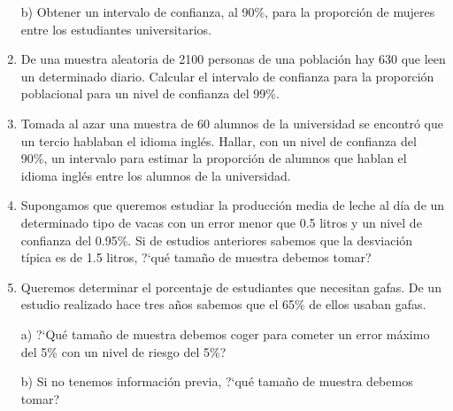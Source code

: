 \begin{adjustwidth}{20pt}{10pt}
\begin{enumerate}[PB. 1. ]
b) Obtener un intervalo de confianza, al 90\%, para la proporción de mujeres entre los estudiantes universitarios.


		
		\hspace{-1cm}\vspace{1cm}
		
	\item 	De una muestra aleatoria de 2100 personas de una población hay 630 que leen un determinado diario. Calcular el intervalo de confianza para la proporción poblacional para un nivel de confianza del 99\%.
		
		\hspace{-1cm}\vspace{1cm}
		
			
	\item 	Tomada al azar una muestra de 60 alumnos de la universidad se encontró que un tercio hablaban el idioma inglés. Hallar, con un nivel de confianza del 90\%, un intervalo para estimar la proporción de alumnos que hablan el idioma inglés entre los alumnos de la universidad.  
		
		\hspace{-1cm}\vspace{1cm}
		
	\item 	Supongamos que queremos estudiar la producción media de leche al día de un determinado tipo de vacas con un error menor que 0.5 litros y un nivel de confianza del 0.95\%. Si de estudios anteriores sabemos que la desviación típica es de 1.5 litros, ?`qué tamaño de muestra debemos tomar?
		
		\hspace{-1cm}\vspace{1cm}
		
	\item 	Queremos determinar el porcentaje de estudiantes que necesitan gafas. De un estudio realizado hace tres años sabemos que el 65\% de ellos usaban gafas.

a) ?`Qué tamaño de muestra debemos coger para cometer un error máximo del 5\% con un nivel de riesgo del 5\%?

b) Si no tenemos información previa, ?`qué tamaño de muestra debemos tomar?  
		

\end{enumerate}
\end{adjustwidth}
